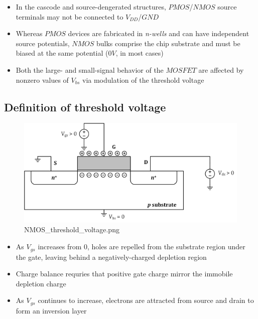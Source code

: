 \documentclass[11pt]{article}
\providecommand{\tightlist}{%
      \setlength{\itemsep}{0pt}\setlength{\parskip}{0pt}}
\begin{document}
    \begin{itemize}
\tightlist
\item
  In the cascode and source-dengerated structures, \(PMOS\)/\(NMOS\)
  source terminals may not be connected to \(V_{DD}\)/\(GND\)
\item
  Whereas \(PMOS\) devices are fabricated in \emph{n-wells} and can have
  independent source potentials, \(NMOS\) bulks comprise the chip
  substrate and must be biased at the same potential (\(0V\), in most
  cases)
\item
  Both the large- and small-signal behavior of the \(MOSFET\) are
  affected by nonzero values of \(V_{bs}\) via modulation of the
  threshold voltage
\end{itemize}

    \hypertarget{definition-of-threshold-voltage}{%
\subsection{Definition of threshold
voltage}\label{definition-of-threshold-voltage}}

    \begin{figure}
\centering
\includegraphics{NMOS_threshold_voltage.png}
\caption{NMOS\_threshold\_voltage.png}
\end{figure}

    \begin{itemize}
\tightlist
\item
  As \(V_{gs}\) increases from \(0\), holes are repelled from the
  substrate region under the gate, leaving behind a negatively-charged
  depletion region
\item
  Charge balance requries that positive gate charge mirror the immobile
  depletion charge
\item
  As \(V_{gs}\) continues to increase, electrons are attracted from
  source and drain to form an inversion layer
\end{itemize}
\end{document}
